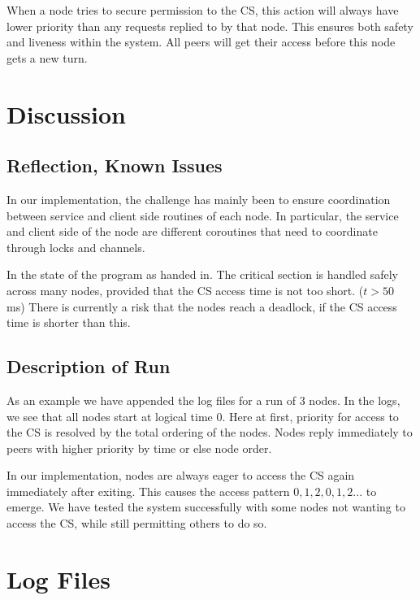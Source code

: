 \documentclass[a4paper,11pt]{article}
\begin{document}
When a node tries to secure permission to the CS, this action will always have lower priority than any requests replied to by that node. This ensures both safety and liveness within the system. All peers will get their access before this node gets a new turn. 

\section{Discussion}

\subsection{Reflection, Known Issues}

In our implementation, the challenge has mainly been to ensure coordination between service and client side routines of each node. In particular, the service and client side of the node are different coroutines that need to coordinate through locks and channels.

\bigbreak

In the state of the program as handed in. The critical section is handled safely across many nodes, provided that the CS access time is not too short. ($t > 50$ ms) There is currently a risk that the nodes reach a deadlock, if the CS access time is shorter than this. 

\subsection{Description of Run}

As an example we have appended the log files for a run of 3 nodes. In the logs, we see that all nodes start at logical time 0. Here at first, priority for access to the CS is resolved by the total ordering of the nodes. Nodes reply immediately to peers with higher priority by time or else node order. 

In our implementation, nodes are always eager to access the CS again immediately after exiting. This causes the access pattern $0, 1, 2, 0, 1, 2 ...$ to emerge. We have tested the system successfully with some nodes not wanting to access the CS, while still permitting others to do so. 

\pagebreak

\section{Log Files}
\end{document}
